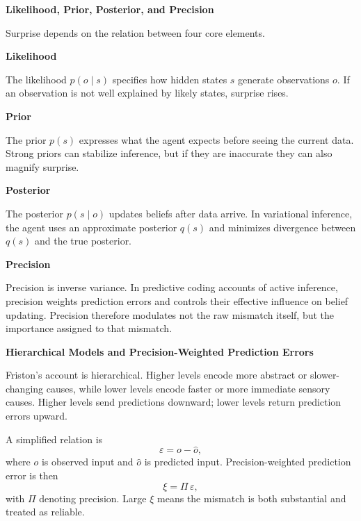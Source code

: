 \documentclass{book}
\providecommand{\ProjectDeepHeading}[2]{%
    \par\medskip\noindent\textbf{#2}\par\smallskip
}
\begin{document}
    
    \ProjectDeepHeading{13}{Likelihood, Prior, Posterior, and Precision}
        Surprise depends on the relation between four core elements.
        
        \ProjectDeepHeading{14}{Likelihood}
            The likelihood $p(o \mid s)$ specifies how hidden states $s$ generate observations $o$. If an observation is not well explained by likely states, surprise rises.
        
        \ProjectDeepHeading{14}{Prior}
            The prior $p(s)$ expresses what the agent expects before seeing the current data. Strong priors can stabilize inference, but if they are inaccurate they can also magnify surprise.
        
        \ProjectDeepHeading{14}{Posterior}
            The posterior $p(s \mid o)$ updates beliefs after data arrive. In variational inference, the agent uses an approximate posterior $q(s)$ and minimizes divergence between $q(s)$ and the true posterior.
        
        \ProjectDeepHeading{14}{Precision}
            Precision is inverse variance. In predictive coding accounts of active inference, precision weights prediction errors and controls their effective influence on belief updating. Precision therefore modulates not the raw mismatch itself, but the importance assigned to that mismatch.
    
    
    \ProjectDeepHeading{13}{Hierarchical Models and Precision-Weighted Prediction Errors}
        Friston's account is hierarchical. Higher levels encode more abstract or slower-changing causes, while lower levels encode faster or more immediate sensory causes. Higher levels send predictions downward; lower levels return prediction errors upward.
        
        A simplified relation is
        \begin{equation}
            \ensuremath{\varepsilon} = o - \hat{o},
        \end{equation}
        where $o$ is observed input and $\hat{o}$ is predicted input. Precision-weighted prediction error is then
        \begin{equation}
            \ensuremath{\xi} = \ensuremath{\Pi} \, \ensuremath{\varepsilon},
        \end{equation}
        with $\ensuremath{\Pi}$ denoting precision. Large $\ensuremath{\xi}$ means the mismatch is both substantial and treated as reliable.
        
        \begin{center}
        \end{center}
    
\end{document}
